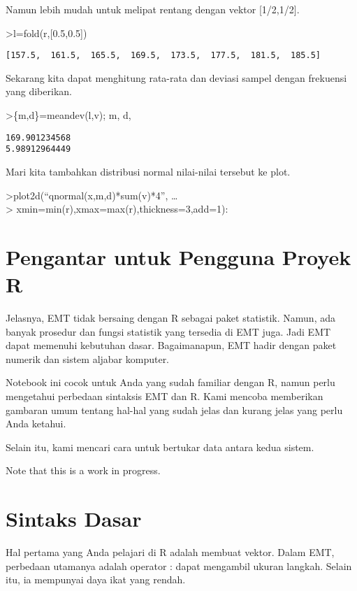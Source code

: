 \documentclass[
]{book}
\begin{document}
Namun lebih mudah untuk melipat rentang dengan vektor {[}1/2,1/2{]}.

\textgreater l=fold(r,{[}0.5,0.5{]})

\begin{verbatim}
[157.5,  161.5,  165.5,  169.5,  173.5,  177.5,  181.5,  185.5]
\end{verbatim}

Sekarang kita dapat menghitung rata-rata dan deviasi sampel dengan frekuensi yang diberikan.

\textgreater\{m,d\}=meandev(l,v); m, d,

\begin{verbatim}
169.901234568
5.98912964449
\end{verbatim}

Mari kita tambahkan distribusi normal nilai-nilai tersebut ke plot.

\textgreater plot2d(``qnormal(x,m,d)*sum(v)*4'', \ldots{}\\
\textgreater{} xmin=min(r),xmax=max(r),thickness=3,add=1):

\chapter{Pengantar untuk Pengguna Proyek R}\label{pengantar-untuk-pengguna-proyek-r}

Jelasnya, EMT tidak bersaing dengan R sebagai paket statistik. Namun, ada banyak prosedur dan fungsi statistik yang tersedia di EMT juga. Jadi EMT dapat memenuhi kebutuhan dasar. Bagaimanapun, EMT hadir dengan paket numerik dan sistem aljabar komputer.

Notebook ini cocok untuk Anda yang sudah familiar dengan R, namun perlu mengetahui perbedaan sintaksis EMT dan R. Kami mencoba memberikan gambaran umum tentang hal-hal yang sudah jelas dan kurang jelas yang perlu Anda ketahui.

Selain itu, kami mencari cara untuk bertukar data antara kedua sistem.

Note that this is a work in progress.

\chapter{Sintaks Dasar}\label{sintaks-dasar}

Hal pertama yang Anda pelajari di R adalah membuat vektor. Dalam EMT, perbedaan utamanya adalah operator : dapat mengambil ukuran langkah. Selain itu, ia mempunyai daya ikat yang rendah.
\end{document}
